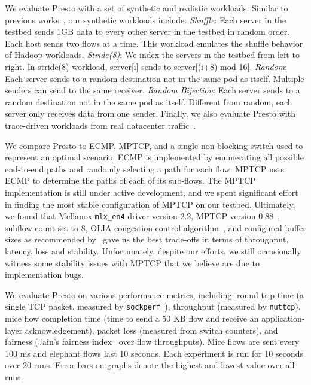 We evaluate Presto with a set of synthetic and realistic workloads. 
Similar to previous works~\cite{fattree,hedera,planck}, our synthetic workloads include:
{\em Shuffle}: Each server in the testbed sends 1GB data to every other server in the testbed in random order. 
Each host sends two flows at a time. %
This workload emulates the shuffle behavior of Hadoop workloads.
{\em Stride(8)}: We index the servers in the testbed from left to right. In stride(8) workload, server[i] sends to server[(i+8) mod 16].
{\em Random}: Each server sends to a random destination 
 not in the same pod as itself. Multiple senders can send to the same receiver.
{\em Random Bijection}: Each server sends to a random destination not in the same pod as itself. 
Different from random, each server only receives data from one sender.
Finally, we also evaluate Presto with trace-driven workloads from real datacenter traffic~\cite{kandula2009nature}.

We compare Presto to ECMP, MPTCP, and a 
single non-blocking switch used to represent an optimal scenario.
ECMP is implemented by enumerating all possible end-to-end paths and randomly selecting a path for each flow.
MPTCP uses ECMP to determine the paths of each of its sub-flows.
The MPTCP implementation is still under active development, and
we spent significant effort in finding the most stable configuration of MPTCP on our testbed. Ultimately, we found that Mellanox {\tt mlx\_en4} driver version
2.2, MPTCP version 0.88~\cite{mptcp-linux}, subflow count set to 8, OLIA congestion control algorithm~\cite{mptcp-not-optimal}, and configured buffer sizes
as recommended by~\cite{dc-mptcp,mptcp-not-optimal,paasch2013benefits} gave us the best trade-offs in terms of throughput, latency, loss and stability.
Unfortunately, despite our efforts, we still occasionally witness some stability issues 
with MPTCP that we believe are due to implementation bugs.

We evaluate Presto on various performance metrics, including: 
round trip time (a single TCP packet, measured by {\tt sockperf}~\cite{sockperf}), 
throughput (measured by {\tt nuttcp}),
mice flow completion time (time to send a 50 KB flow and receive an application-layer acknowledgement), packet loss (measured from switch counters), 
and fairness (Jain's fairness index~\cite{jain-fair} over flow throughputs).  Mice flows are sent every 100 ms and elephant flows last 10 seconds. 
Each experiment is run for 10 seconds over 20 runs. Error bars on graphs denote
the highest and lowest value over all runs.

